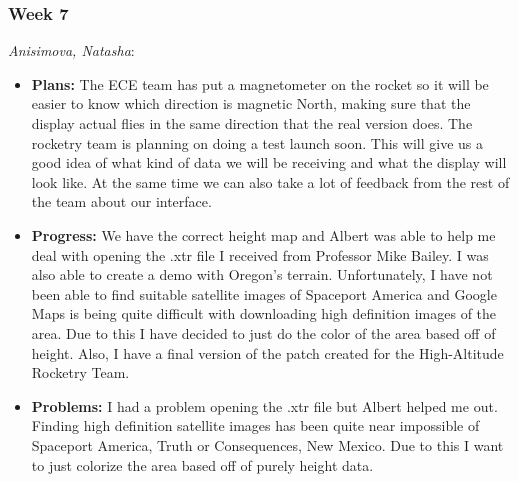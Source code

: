 \documentclass[10pt,draftclsnofoot,onecolumn]{IEEEtran}
\newcommand{\subsubsubsection}[1]{
	\hfill\break\textit{#1}:
}
\begin{document}
\subsubsection{Week 7}
\subsubsubsection{Anisimova, Natasha}
\begin{itemize}
	\item \textbf{Plans: }
	The ECE team has put a magnetometer on the rocket so it will be easier to know which direction is magnetic North, making sure that the display actual flies in the same direction that the real version does. The rocketry team is planning on doing a test launch soon. This will give us a good idea of what kind of data we will be receiving and what the display will look like. At the same time we can also take a lot of feedback from the rest of the team about our interface.
	\item \textbf{Progress: }
	We have the correct height map and Albert was able to help me deal with opening the .xtr file I received from Professor Mike Bailey. I was also able to create a demo with Oregon's terrain. Unfortunately, I have not been able to find suitable satellite images of Spaceport America and Google Maps is being quite difficult with downloading high definition images of the area. Due to this I have decided to just do the color of the area based off of height. Also, I have a final version of the patch created for the High-Altitude Rocketry Team.

	\item \textbf{Problems: }
	I had a problem opening the .xtr file but Albert helped me out. Finding high definition satellite images has been quite near impossible of Spaceport America, Truth or Consequences, New Mexico. Due to this I want to just colorize the area based off of purely height data.
\end{itemize}
\end{document}
